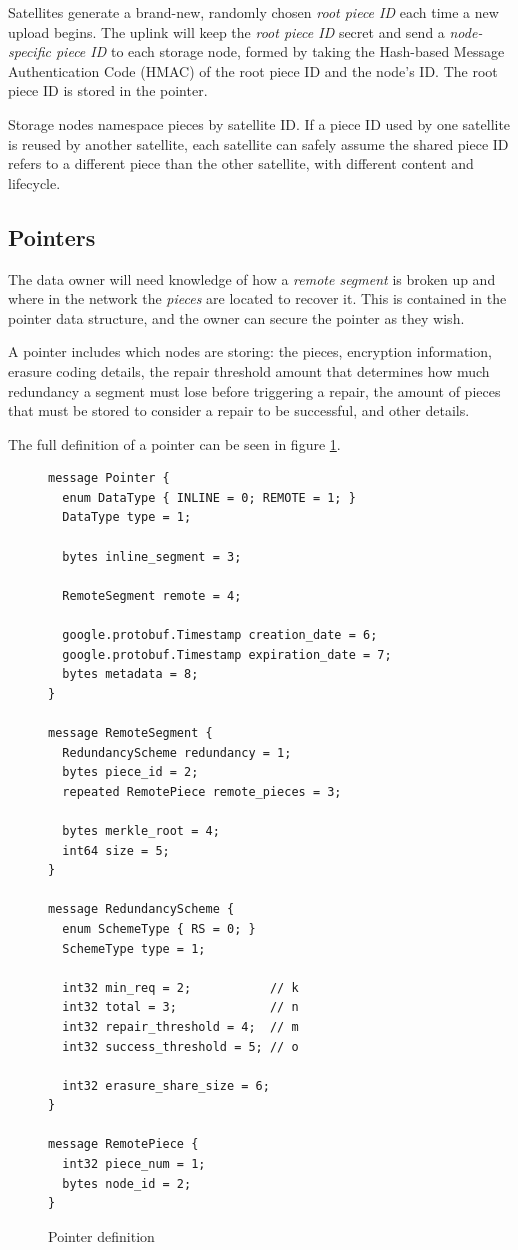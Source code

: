 \documentclass[11pt,fleqn,openany]{book}
\begin{document}
Satellites generate a brand-new, randomly chosen {\em root piece ID} each time
a new upload begins. The uplink will keep the {\em root piece ID} secret and send
a {\em node-specific piece ID} to each storage node, formed by taking the Hash-based
Message Authentication Code (HMAC) of the root piece ID and the node's ID.
The root piece ID is stored in the pointer.

Storage nodes namespace pieces by satellite ID. If a piece ID used by one
satellite is reused by another satellite, each satellite can safely assume the shared piece ID refers
to a different piece than the other satellite, with different content and lifecycle.

\subsection{Pointers}

The data owner will need knowledge of how a {\em remote segment} is broken up and
where in the network the {\em pieces} are located to recover it. This is contained
in the pointer data structure, and the owner can secure the pointer as
they wish.

A pointer includes which nodes are storing: the pieces,
encryption information, erasure coding details,
the repair threshold amount that determines how much redundancy a segment
must lose before triggering a repair, the amount of pieces that must be
stored to consider a repair to be successful, and other details.

The full definition of a pointer can be seen in figure \ref{fig:pointer}.

\begin{figure}
\lstset{language=protobuf}
\begin{lstlisting}
message Pointer {
  enum DataType { INLINE = 0; REMOTE = 1; }
  DataType type = 1;

  bytes inline_segment = 3;

  RemoteSegment remote = 4;

  google.protobuf.Timestamp creation_date = 6;
  google.protobuf.Timestamp expiration_date = 7;
  bytes metadata = 8;
}

message RemoteSegment {
  RedundancyScheme redundancy = 1;
  bytes piece_id = 2;
  repeated RemotePiece remote_pieces = 3;

  bytes merkle_root = 4;
  int64 size = 5;
}

message RedundancyScheme {
  enum SchemeType { RS = 0; }
  SchemeType type = 1;

  int32 min_req = 2;           // k
  int32 total = 3;             // n
  int32 repair_threshold = 4;  // m
  int32 success_threshold = 5; // o

  int32 erasure_share_size = 6;
}

message RemotePiece {
  int32 piece_num = 1;
  bytes node_id = 2;
}
\end{lstlisting}
\caption{Pointer definition}
\label{fig:pointer}
\end{figure}
\end{document}
